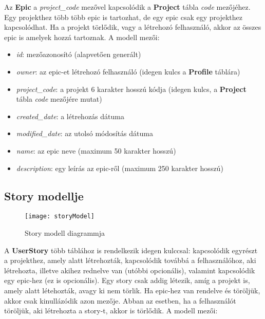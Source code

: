 Az \textbf{Epic} a \textit{project\_code} mezővel kapcsolódik a \textbf{Project} tábla \textit{code} mezőjéhez. Egy projekthez több több epic is tartozhat, de egy epic csak egy projekthez kapcsolódhat. Ha a projekt törlődik, vagy a létrehozó felhasználó, akkor az összes epic is amelyek hozzá tartoznak. A modell mezői:

\begin{itemize}
	\item \textit{id}: mezőazonosító (alapvetően generált)
	\item \textit{owner}: az epic-et létrehozó felhasználó (idegen kulcs a \textbf{Profile} táblára)
	\item \textit{project\_code}: a projekt 6 karakter hosszú kódja (idegen kulcs, a \textbf{Project} tábla \textit{code} mezőjére mutat)
	\item \textit{created\_date}: a létrehozás dátuma
	\item \textit{modified\_date}: az utolsó módosítás dátuma
	\item \textit{name}: az epic neve (maximum 50 karakter hosszú)
	\item \textit{description}: egy leírás az epic-ről (maximum 250 karakter hosszú)
\end{itemize}

\subsection{Story modellje}

\begin{figure}[H]
	\centering
	\texttt{[image: storyModel]}
	\caption{Story modell diagrammja}
	\label{fig:storymodel}
\end{figure}

A \textbf{UserStory} több táblához is rendelkezik idegen kulccsal: kapcsolódik egyrészt a projekthez, amely alatt létrehozták, kapcsolódik továbbá a felhasználóhoz, aki létrehozta, illetve akihez rednelve van (utóbbi opcionális), valamint kapcsolódik egy epic-hez (ez is opcionális). Egy story csak addig létezik, amíg a projekt is, amely alatt létehozták, avagy ki nem törlik. Ha epic-hez van rendelve és töröljük, akkor csak kinullázódik azon mezője. Abban az esetben, ha a felhasználót töröljük, aki létrehozta a story-t, akkor is törlődik. A modell mezői:

